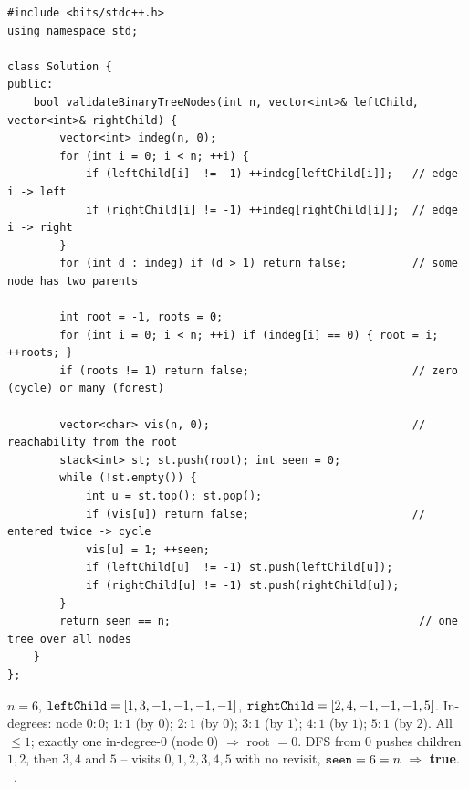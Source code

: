 \begin{lstlisting}[caption={Validate Binary Tree Nodes (LeetCode 1361)}, label={lst:c04-validate-array}]
#include <bits/stdc++.h>
using namespace std;

class Solution {
public:
    bool validateBinaryTreeNodes(int n, vector<int>& leftChild, vector<int>& rightChild) {
        vector<int> indeg(n, 0);
        for (int i = 0; i < n; ++i) {
            if (leftChild[i]  != -1) ++indeg[leftChild[i]];   // edge i -> left
            if (rightChild[i] != -1) ++indeg[rightChild[i]];  // edge i -> right
        }
        for (int d : indeg) if (d > 1) return false;          // some node has two parents

        int root = -1, roots = 0;
        for (int i = 0; i < n; ++i) if (indeg[i] == 0) { root = i; ++roots; }
        if (roots != 1) return false;                         // zero (cycle) or many (forest)

        vector<char> vis(n, 0);                               // reachability from the root
        stack<int> st; st.push(root); int seen = 0;
        while (!st.empty()) {
            int u = st.top(); st.pop();
            if (vis[u]) return false;                         // entered twice -> cycle
            vis[u] = 1; ++seen;
            if (leftChild[u]  != -1) st.push(leftChild[u]);
            if (rightChild[u] != -1) st.push(rightChild[u]);
        }
        return seen == n;                                      // one tree over all nodes
    }
};
\end{lstlisting}

\begin{tracebox}
$n=6$, $\texttt{leftChild}=[1,3,-1,-1,-1,-1]$, $\texttt{rightChild}=[2,4,-1,-1,-1,5]$.
In-degrees: node $0{:}0$; $1{:}1$ (by $0$); $2{:}1$ (by $0$); $3{:}1$ (by $1$); $4{:}1$ (by $1$);
$5{:}1$ (by $2$). All $\le 1$; exactly one in-degree-$0$ (node $0$) $\Rightarrow$ root $=0$.
DFS from $0$ pushes children $1,2$, then $3,4$ and $5$ -- visits $0,1,2,3,4,5$ with no
revisit, $\texttt{seen}=6=n$ $\Rightarrow$ \textbf{true}. \checkmark\ .
\end{tracebox}


